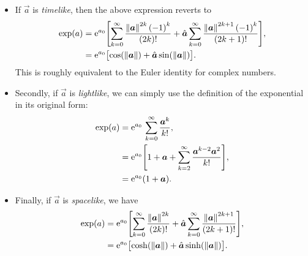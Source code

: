 \begin{itemize}
    \item If \(\vec{a}\) is \emph{timelike}, then the above expression reverts to
        \begin{equation}
            \begin{split}
                \exp(a) &= \ec^{a_0}\qty[\sum_{k=0}^\infty \frac{\norm{\vec{a}}^{2k}\,\qty(-1)^k}{(2k)!} + \uvec{a}\sum_{k=0}^\infty \frac{\norm{\vec{a}}^{2k+1} \, \qty(-1)^k}{(2k+1)!}], \\
                        &= \ec^{a_0}\qty\big[\cos(\norm{\vec{a}})  + \uvec{a}\sin(\norm{\vec{a}})]. \\
            \end{split}
        \end{equation}
        This is roughly equivalent to the Euler identity for complex numbers. 
    \item Secondly, if \(\vec{a}\) is \emph{lightlike}, we can simply use the definition of the exponential in its original form:
        \begin{equation}
            \begin{split}
                \exp(a) &= \ec^{a_0}\,\sum^{\infty}_{k=0} \frac{\vec{a}^k}{k!}, \\
                        &= \ec^{a_0}\qty[1 + \vec{a} + \sum^{\infty}_{k=2} \frac{\vec{a}^{k-2}\vec{a}^2}{k!}], \\
                        &= \ec^{a_0}\qty(1 + \vec{a}). \\
            \end{split}
        \end{equation}
    \item Finally, if \(\vec{a}\) is \emph{spacelike}, we have
        \begin{equation}
            \begin{split}
                \exp(a) &= \ec^{a_0}\qty[\sum_{k=0}^\infty \frac{\norm{\vec{a}}^{2k}}{(2k)!} 
                           + \uvec{a}\sum_{k=0}^\infty \frac{\norm{\vec{a}}^{2k+1}}{(2k+1)!}], \\
                        &= \ec^{a_0}\qty\big[\cosh(\norm{\vec{a}}) + \uvec{a}\sinh(\norm{\vec{a}})]. \\
            \end{split}
        \end{equation}
\end{itemize}

